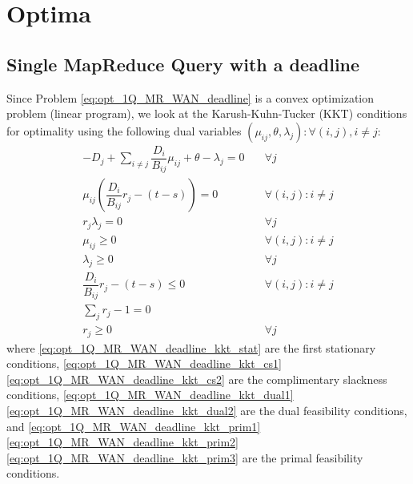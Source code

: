 \section{Optima}
\label{sec:optima}

\subsection{Single MapReduce Query with a deadline}

Since Problem \eqref{eq:opt_1Q_MR_WAN_deadline} is a convex optimization problem (linear program), we look at the Karush-Kuhn-Tucker (KKT) conditions for optimality using the following dual variables $(\mu_{ij},\theta,\lambda_j):\forall (i,j),i\neq j$:
\begin{subequations}\label{eq:opt_1Q_MR_WAN_deadline_kkt}
	\begin{align}
		-D_j+\sum_{i\neq j}\dfrac{D_i}{B_{ij}}\mu_{ij} + \theta - \lambda_j = 0 & \quad \forall j \label{eq:opt_1Q_MR_WAN_deadline_kkt_stat}\\
		\mu_{ij}\left(\dfrac{D_{i}}{B_{ij}}r_{j} - (t - s)\right) = 0 & \quad \forall (i,j):i\neq j \label{eq:opt_1Q_MR_WAN_deadline_kkt_cs1}\\
		r_j\lambda_j = 0 & \quad \forall j \label{eq:opt_1Q_MR_WAN_deadline_kkt_cs2}\\
		\mu_{ij} \geq 0 & \quad \forall (i,j):i\neq j \label{eq:opt_1Q_MR_WAN_deadline_kkt_dual1}\\
		\lambda_j \geq 0  & \quad \forall j \label{eq:opt_1Q_MR_WAN_deadline_kkt_dual2}\\
		\dfrac{D_{i}}{B_{ij}}r_{j} - (t - s) \leq 0  & \quad \forall (i,j):i\neq j \label{eq:opt_1Q_MR_WAN_deadline_kkt_prim1}\\
		\sum_{j}r_{j} - 1 = 0 & \label{eq:opt_1Q_MR_WAN_deadline_kkt_prim2}\\
		r_{j} \geq 0 & \quad \forall j \label{eq:opt_1Q_MR_WAN_deadline_kkt_prim3}
	\end{align}
\end{subequations}
where \eqref{eq:opt_1Q_MR_WAN_deadline_kkt_stat} are the first stationary conditions, \eqref{eq:opt_1Q_MR_WAN_deadline_kkt_cs1} \eqref{eq:opt_1Q_MR_WAN_deadline_kkt_cs2} are the complimentary slackness conditions, \eqref{eq:opt_1Q_MR_WAN_deadline_kkt_dual1} \eqref{eq:opt_1Q_MR_WAN_deadline_kkt_dual2} are the dual feasibility conditions, and \eqref{eq:opt_1Q_MR_WAN_deadline_kkt_prim1} \eqref{eq:opt_1Q_MR_WAN_deadline_kkt_prim2} \eqref{eq:opt_1Q_MR_WAN_deadline_kkt_prim3} are the primal feasibility conditions.

